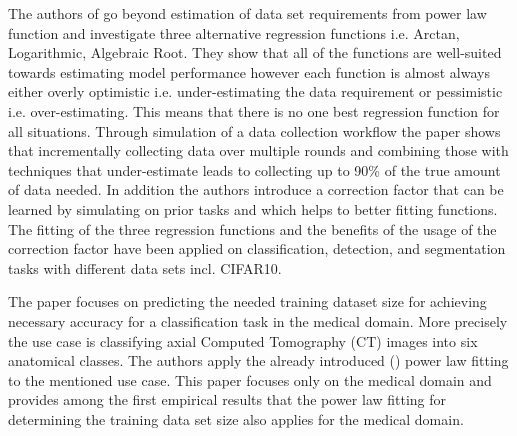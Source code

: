 \documentclass{article} %
\begin{document}
The authors of \cite{mahmood2022data} go beyond estimation of data set requirements from power law function and investigate three alternative regression functions i.e. Arctan, Logarithmic, Algebraic Root. They show that all of the functions are well-suited towards estimating model performance however each function is almost always either overly optimistic i.e. under-estimating the data requirement or pessimistic i.e. over-estimating. This means that there is no one best regression function for all situations. Through simulation of a data collection workflow the paper shows that incrementally collecting data over multiple rounds and combining those with techniques that under-estimate leads to collecting up to 90\% of the true amount of data needed. In addition the authors introduce a correction factor that can be learned by simulating on prior tasks and which helps to better fitting functions. The fitting of the three regression functions and the benefits of the usage of the correction factor have been applied on classification, detection, and segmentation tasks with different data sets incl. CIFAR10.

The paper \cite{cho2016data} focuses on predicting the needed training dataset size for achieving necessary accuracy for a classification task in the medical domain. More precisely the use case is classifying axial Computed Tomography (CT) images into six anatomical classes. The authors apply the already introduced (\cite{Figueroa2012PredictingSampleSizeForClass}) power law fitting to the mentioned use case. This paper focuses only on the medical domain and provides among the first empirical results that the power law fitting for determining the training data set size also applies for the medical domain.
\end{document}
